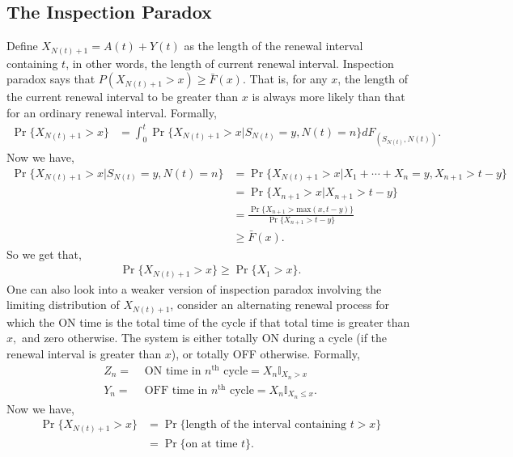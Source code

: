 \documentclass[a4paper,10pt,english]{article}
\begin{document}

\subsection{The Inspection Paradox}
Define $X_{N(t)+1}=A(t)+Y(t)$ as the length of the renewal interval containing $t$, in other words, the length of current renewal interval. Inspection paradox says that $P(X_{N(t)+1} >x)\geq \bar{F}(x)$. That is, for any $x$, the length of the current renewal interval to be greater than $x$ is always more likely than that for an ordinary renewal interval. Formally,
\begin{align*}
\Pr\{X_{N(t)+1}>x\}&= \int_{0}^t\Pr\{X_{N(t)+1} > x | S_{N(t)} = y, N(t)=n\}dF_{(S_{N(t)}, N(t))}.
\end{align*}
Now we have,
\begin{align*}
\Pr\{X_{N(t)+1}>x | S_{N(t)}=y, N(t)=n\} & = \Pr\{X_{N(t)+1}>x | X_1+\cdots+X_n=y, X_{n+1}>t-y\} \\
& = \Pr\{X_{n+1}>x | X_{n+1}>t-y\} \\
& = \frac{\Pr\{X_{n+1}>\text{max}(x,t-y)\}}{\Pr\{X_{n+1}>t-y\}} \\
& \geq \bar{F}(x). 
\end{align*}
So we get that,
\begin{align*}
\Pr\{X_{N(t)+1}>x\}\geq \Pr\{X_{1}>x\}.
\end{align*}
One can also look into a weaker version of inspection paradox involving
the limiting distribution of $X_{N(t)+1}$, consider an alternating 
renewal process for which the ON time is the total time of the cycle if that 
total time is greater than $x,$ and zero otherwise. The system is either totally ON 
during a cycle (if the renewal interval is greater than $x$), or totally OFF 
otherwise. Formally,
\begin{align*}
Z_n= &\text{ ON time in $n^{\text{th}}$ cycle} = X_n \mathbb{I}_{X_n>x} \\
Y_n= &\text{ OFF time in $n^{\text{th}}$ cycle} = X_n \mathbb{I}_{X_n\leq x}.
\end{align*}
Now we have,
\begin{align*}
\Pr \{X_{N(t)+1}>x\} &= \Pr\{\text{length of the interval containing } t>x\}\\
&= \Pr\{ \text{on at time } t \}.
\end{align*}
\end{document}
